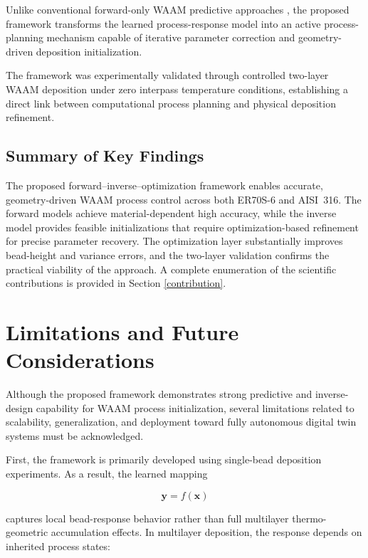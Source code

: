 \documentclass[11pt]{article}
\begin{document}
Unlike conventional forward-only WAAM predictive approaches \cite{Ding2015,Karmuhilan2018}, the proposed framework transforms the learned process-response model into an active process-planning mechanism capable of iterative parameter correction and geometry-driven deposition initialization.

The framework was experimentally validated through controlled two-layer WAAM deposition under zero interpass temperature conditions, establishing a direct link between computational process planning and physical deposition refinement.

\subsection{Summary of Key Findings}

The proposed forward--inverse--optimization framework enables accurate, geometry-driven
WAAM process control across both ER70S-6 and AISI~316. The forward models achieve
material-dependent high accuracy, while the inverse model provides feasible initializations
that require optimization-based refinement for precise parameter recovery. The optimization
layer substantially improves bead-height and variance errors, and the two-layer validation
confirms the practical viability of the approach. A complete enumeration of the scientific
contributions is provided in Section \ref{contribution}.



\section{Limitations and Future Considerations}

Although the proposed framework demonstrates strong predictive and inverse-design capability for WAAM process initialization, several limitations related to scalability, generalization, and deployment toward fully autonomous digital twin systems must be acknowledged.

First, the framework is primarily developed using single-bead deposition experiments. As a result, the learned mapping

\begin{equation}
\mathbf{y} = f(\mathbf{x})
\end{equation}

captures local bead-response behavior rather than full multilayer thermo-geometric accumulation effects. In multilayer deposition, the response depends on inherited process states:
\end{document}
